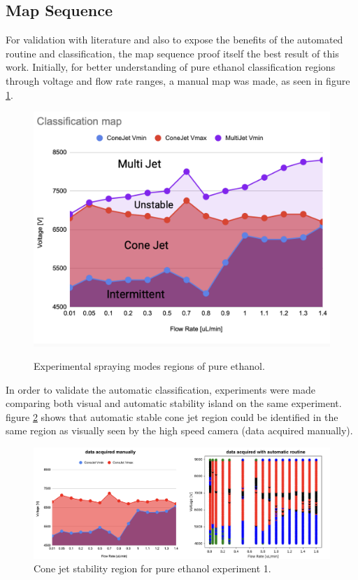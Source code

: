 \subsection{Map Sequence}
\label{subsec:map_results}

For validation with literature and also to expose the benefits of the automated routine and classification, the map sequence proof itself the best result of this work. 
Initially, for better understanding of pure ethanol classification regions through voltage and flow rate ranges, a manual map was made, as seen in figure \ref{fig:stability_1}.

    \begin{figure}[H]
        \center
        \includegraphics[width=12cm]{Figuras/regions.png}
        \label{fig:stability_1}
        \caption{Experimental spraying modes regions of pure ethanol.}
    \end{figure}


    In order to validate the automatic classification, experiments were made comparing both visual and automatic stability island on the same experiment.
    figure \ref{fig:stability_2} shows that automatic stable cone jet region could be identified in the same region as visually seen by the high speed camera (data acquired manually).

        \begin{figure}[H]
            \center
            \includegraphics[width=16cm]{Figuras/april/manual_stability_island.png}
            \caption{Cone jet stability region for pure ethanol experiment 1.}
            \label{fig:stability_2}
        \end{figure}


